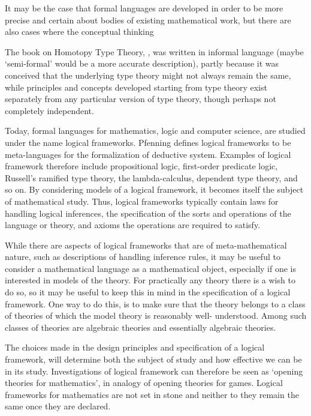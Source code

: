 \documentclass{article}
\begin{document}
It may be the case that formal languages are developed in order to be more
precise and certain about bodies of existing mathematical work, but there are
also cases where the conceptual thinking 

The book on Homotopy Type Theory, \cite{TheBook}, was written in informal
language (maybe `semi-formal' would be a more accurate description), 
partly because it was conceived that the underlying type theory might
not always remain the same, while principles and concepts developed starting
from type theory exist separately from any particular version of type 
theory, though perhaps not completely independent. 

Today, formal languages for mathematics, logic and computer science, are studied
under the name logical frameworks.
Pfenning \cite{PfenningLFintro} defines logical frameworks
to be meta-languages for the formalization of deductive system. Examples of
logical framework therefore include propositional logic, first-order predicate 
logic, Russell's ramified type theory, the lambda-calculus, dependent type 
theory, and so on. By considering models of a logical framework, it becomes
itself the subject of mathematical study. Thus, logical frameworks typically
contain laws for handling logical inferences, the specification of the sorts
and operations of the language or theory, and axioms the operations are required to
satisfy. 

While there are aspects of logical frameworks that are of meta-mathematical 
nature, such as descriptions of handling inference rules, it may be useful to
consider a mathematical language as a mathematical object, especially if one
is interested in models of the theory. For practically any theory there is a
wish to do so, so it may be useful to keep this in mind in the specification
of a logical framework. One way to do this, is to make sure that the theory
belongs to a class of theories of which the model theory is reasonably well-%
understood. Among such classes of theories are algebraic theories and
essentially algebraic theories.

The choices made in the design principles and specification of a logical 
framework, will determine both the subject of study and how effective we can be
in its study. Investigations of logical framework can therefore be seen as
`opening theories for mathematics', in analogy of opening theories for games.
Logical frameworks for mathematics are not set in stone and 
neither to they remain the same once they are declared.
\end{document}
